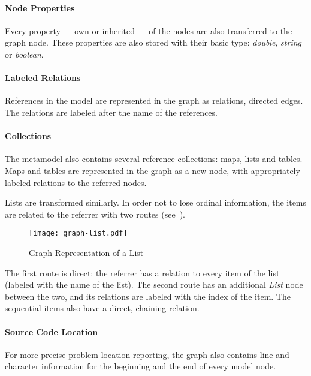 
\paragraph{Node Properties}
Every property --- own or inherited --- of the nodes are also transferred to the graph node. These properties are also stored with their basic type: \emph{double}, \emph{string} or \emph{boolean}.

\paragraph{Labeled Relations}
References in the model are represented in the graph as relations, directed edges. The relations are labeled after the name of the references.

\paragraph{Collections}
The metamodel also contains several reference collections: maps, lists and tables. Maps and tables are represented in the graph as a new node, with appropriately labeled relations to the referred nodes.

Lists are transformed similarly. In order not to lose ordinal information, the items are related to the referrer with two routes (see~).

\begin{figure}[!htb]
  \centering
  \texttt{[image: graph-list.pdf]}
  \caption{Graph Representation of a List}
  \label{fig:graph-list}
\end{figure}

The first route is direct; the referrer has a relation to every item of the list (labeled with the name of the list). The second route has an additional \emph{List} node between the two, and its relations are labeled with the index of the item. The sequential items also have a direct, chaining relation.


\paragraph{Source Code Location}
For more precise problem location reporting, the graph also contains line and character information for the beginning and the end of every model node.


